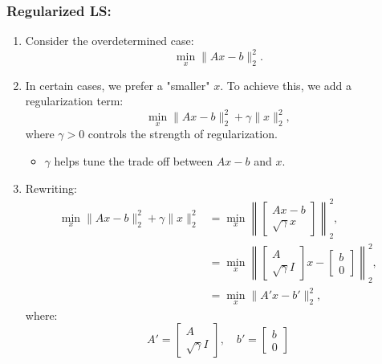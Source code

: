 \subsubsection{Regularized LS:}
\begin{example}
    \begin{enumerate}
        \item Consider the overdetermined case:
        \[
        \min_x \|Ax - b\|_2^2.
        \]
        
        \item In certain cases, we prefer a "smaller" \(x\). To achieve this, we add a regularization term:
        \[
        \min_x \|Ax - b\|_2^2 + \gamma \|x\|_2^2,
        \]
        where \(\gamma > 0\) controls the strength of regularization.
        \begin{itemize}
            \item $\gamma$ helps tune the trade off between $Ax-b$ and $x$.
        \end{itemize}
        
        \item Rewriting:
        \begin{align*}
        \min_x \|Ax - b\|_2^2 + \gamma \|x\|_2^2 
        &= \min_x \left\|
            \begin{bmatrix}
            A x - b\\ 
            \sqrt{\gamma} x
            \end{bmatrix}
            \right\|_2^2, \\
        &= \min_x \left\|
        \begin{bmatrix}
        A \\ 
        \sqrt{\gamma} I
        \end{bmatrix}
        x - 
        \begin{bmatrix}
        b \\ 
        0
        \end{bmatrix}
        \right\|_2^2, \\
        &= \min_x \|A'x - b'\|_2^2,
        \end{align*}
        where:
        \[
        A' = 
        \begin{bmatrix}
        A \\ 
        \sqrt{\gamma} I
        \end{bmatrix},
        \quad 
        b' = 
        \begin{bmatrix}
        b \\ 
        0
        \end{bmatrix}
        \]
        

\end{enumerate}
\end{example}

